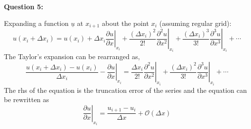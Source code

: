 \documentclass[12pts,a4paper,amsmath,amssymb,floatfix]{article}%
\newcommand{\frc}{\displaystyle\frac}
\begin{document}
\clearpage

\begin{flushleft}
{\bf Question 5:}
\end{flushleft}
Expanding a function $\underline{u}$ at $x_{i+1}$ about the point $x_{i}$ (assuming regular grid):
\begin{displaymath}
u\left(x_{i}+\Delta x_{i}\right) = u\left(x_{i}\right) + \Delta x_{i}\left.\frc{\partial u}{\partial x}\right|_{x_{i}} + \frc{\left(\Delta x_{i}\right)^{2}}{2!}\left.\frc{\partial^{2}u}{\partial x^{2}}\right|_{x_{i}} + \frc{\left(\Delta x_{i}\right)^{3}}{3!}\left.\frc{\partial^{3}u}{\partial x^{3}}\right|_{x_{i}} + \cdots 
\end{displaymath}
The Taylor's expansion can be rearranged as,
\begin{displaymath}
\frc{u\left(x_{i}+\Delta x_{i}\right)-u\left(x_{i}\right)}{\Delta x_{i}} - \left.\frc{\partial u}{\partial x}\right|_{x_{i}} = \frc{\Delta x_{i}}{2!}\left.\frc{\partial^{2}u}{\partial x^{2}}\right|_{x_{i}} + \frc{\left(\Delta x_{i}\right)^{2}}{3!}\left.\frc{\partial^{3}u}{\partial x^{3}}\right|_{x_{i}} + \cdots 
\end{displaymath}
The rhs of the equation is the truncation error of the series and the equation can be rewritten as
\begin{displaymath}
\left.\frc{\partial u}{\partial x}\right|_{x_{i}} = \frc{u_{i+1}-u_{i}}{\Delta x} + \mathcal{O}\left(\Delta x\right)
\end{displaymath}
\end{document}
